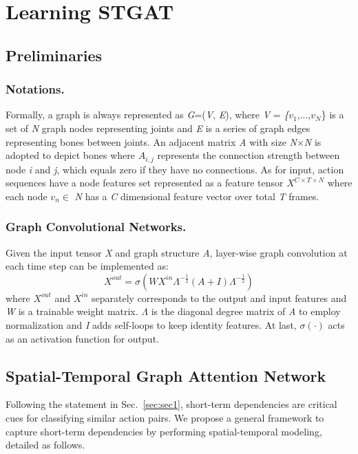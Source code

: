 \documentclass[runningheads]{llncs}
\begin{document}
\section{Learning STGAT}
\subsection{Preliminaries}
\subsubsection{Notations.}
Formally, a graph is always represented as \textit{G}=(\textit{V}, \textit{E}), where \textit{V} = \textit\{$v_{1}$,...,$v_{N}$\} is a set of \textit{N} graph nodes representing joints and \textit{E} is a series of graph edges representing bones between joints. An adjacent matrix \textit{A} with size \textit{N}$\times$\textit{N} is adopted to depict bones where $A_{i,j}$ represents the connection strength between node \textit{i} and \textit{j}, which equals zero if they have no connections. As for input, action sequences have a node features set represented as a feature tensor $X^{C\times T\times N}$ where each node $v_{n}\in$ \textit{N} has a \textit{C} dimensional feature vector over total \textit{T} frames.
\subsubsection{Graph Convolutional Networks.}
Given the input tensor \textit{X} and graph structure \textit{A}, layer-wise graph convolution at each time step can be implemented as:
\begin{equation}
\label{e1}
X^{out}=\sigma(WX^{in}\Lambda^{-\frac{1}{2}}(A+I)\Lambda^{-\frac{1}{2}})
\end{equation}    
where $X^{out}$ and $X^{in}$ separately corresponds to the output and input features and \textit{W} is a trainable weight matrix. \iffalse Only 1-hop neighbors of \textit{A} have the same normalized non-zero value.\fi $\Lambda$ is the diagonal degree matrix of \textit{A} to employ normalization and \textit{I} adds self-loops to keep identity features. At last, $\sigma (\cdot)$ acts as an activation function for output. 
  
\subsection{Spatial-Temporal Graph Attention Network}
Following the statement in Sec.~\ref{sec:sec1}, short-term dependencies are critical cues for classifying similar action pairs. We propose a general framework to capture short-term dependencies by performing spatial-temporal modeling, detailed as follows.
  
\end{document}

